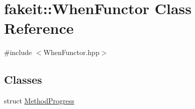 \hypertarget{classfakeit_1_1WhenFunctor}{}\section{fakeit\+::When\+Functor Class Reference}
\label{classfakeit_1_1WhenFunctor}


{\ttfamily \#include $<$When\+Functor.\+hpp$>$}

\subsection*{Classes}
\begin{DoxyCompactItemize}
\item 
struct \mbox{\hyperlink{structfakeit_1_1WhenFunctor_1_1MethodProgress}{Method\+Progress}}
\end{DoxyCompactItemize}
